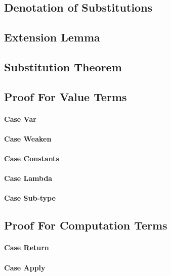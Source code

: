 {    \subsection{Denotation of Substitutions}
    
    \subsection{Extension Lemma}
   
    \subsection{Substitution Theorem}

    \subsection{Proof For Value Terms}
    \paragraph{Case Var}
    
    \paragraph{Case Weaken}
   
    \paragraph{Case Constants}
    
    \paragraph{Case Lambda}

    \paragraph{Case Sub-type}
    
    \subsection{Proof For Computation Terms}
    \paragraph{Case Return}
    \paragraph{Case Apply}
    
}
